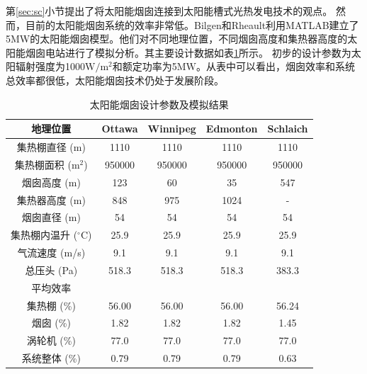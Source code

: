 第\ref{sec:sc}小节提出了将太阳能烟囱连接到太阳能槽式光热发电技术的观点。
然而，目前的太阳能烟囱系统的效率非常低。Bilgen和Rheault利用MATLAB建立了5MW的太阳能烟囱模型\cite{Bilgen2005}。他们对不同地理位置，不同烟囱高度和集热器高度的太阳能烟囱电站进行了模拟分析。其主要设计数据如表\ref{tab:sc}所示。 初步的设计参数为太阳辐射强度为1000$\mathrm{W/m^2}$和额定功率为5$\mathrm{MW}$。从表中可以看出，烟囱效率和系统总效率都很低，太阳能烟囱技术仍处于发展阶段。
\begin{table}[htbp]
	\caption{太阳能烟囱设计参数及模拟结果}
	\begin{center}
	\begin{tabular}{ccccc}
		\toprule
		地理位置	&Ottawa    &Winnipeg    &Edmonton    &Schlaich\\
		\midrule
		集热棚直径 (m)    &	1110	&	1110	&	1110	&	1110 \\
  集热棚面积 ($\mathrm{m^2}$)    & 950000    & 950000	&	950000	&	950000\\
  烟囱高度 (m)    &123    &60    &    35&    547\\
  集热器高度 (m)    &848    &975    &1024    &    -\\
  烟囱直径 (m)    &54    &54    &54    &54\\
  集热棚内温升 ($\mathrm{^\circ C}$)    &25.9    &25.9    &25.9    &25.9\\
  气流速度 (m/s)&9.1    &9.1    &9.1    &9.1\\
  总压头 (Pa)&518.3    &518.3    &518.3    &383.3\\
  平均效率\\
  集热棚 (\%)    &56.00    &56.00    &56.00    &56.24\\
  烟囱 (\%)    &1.82    &1.82    &1.82    &1.45\\
  涡轮机 (\%)    &77.0    &77.0    &77.0    &77.0\\
  系统整体 (\%)    &0.79    &0.79    &0.79    &0.63\\
		\bottomrule
	\end{tabular}
	\end{center}
	\label{tab:sc}
\end{table}

